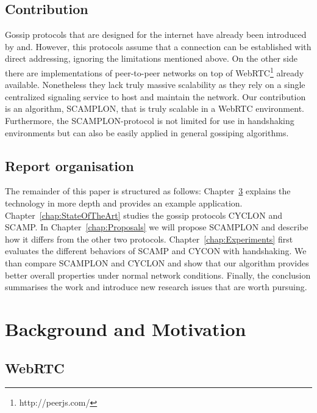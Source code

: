 \documentclass[11pt, english, screen]{report-rd-info}
\begin{document}
\section{Contribution}

Gossip protocols that are designed for the internet have already been introduced by \cite{Ganesh:2003:PMM:642778.642782} and\cite{Voulgaris03arobust}.
However, this protocols assume that a connection can be established with direct addressing, ignoring the limitations mentioned above.
On the other side there are implementations of peer-to-peer networks on top of WebRTC\footnote{http://peerjs.com/} already available. 
Nonetheless they lack truly massive scalability as they rely on a single centralized signaling service to host and maintain the network.
Our contribution is an algorithm, SCAMPLON, that is truly scalable in a WebRTC environment.
Furthermore, the SCAMPLON-protocol is not limited for use in handshaking environments but can also be easily applied in general gossiping algorithms.

\section{Report organisation}

The remainder of this paper is structured as follows: 
Chapter~\ref{chap:Motiv} explains the technology in more depth and provides an example application. 
Chapter~\ref{chap:StateOfTheArt} studies the gossip protocols CYCLON and SCAMP. 
In Chapter~\ref{chap:Proposals}  we will propose SCAMPLON and describe how it differs from the other two protocols.
Chapter~\ref{chap:Experiments} first evaluates the different behaviors of SCAMP and CYCON with handshaking. We than compare SCAMPLON and CYCLON and show that our algorithm provides better overall properties under normal network conditions.
Finally, the conclusion summarises the work and introduce new research issues that are worth pursuing.

\chapter{Background and Motivation}
\label{chap:Motiv}

\section{WebRTC}
\end{document}
